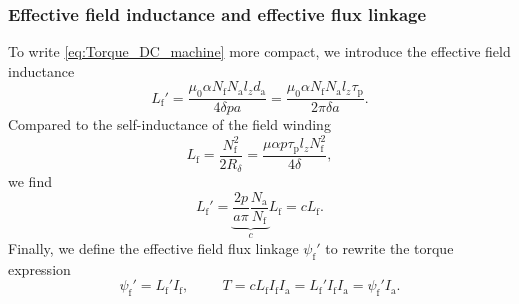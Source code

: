 \begin{frame}
	\frametitle{Effective field inductance and effective flux linkage}
    To write \eqref{eq:Torque_DC_machine} more compact, we introduce the effective field inductance 
	\begin{equation}
		L_\mathrm{f}' =  \frac{\mu_0 \alpha N_\mathrm{f} N_\mathrm{a} l_z d_\mathrm{a}}{4 \delta p a } = \frac{\mu_0 \alpha N_\mathrm{f} N_\mathrm{a} l_z \tau_\mathrm{p}}{2 \pi  \delta a}.
		\label{eq:Effective_field_inductance}
	\end{equation} \pause
	Compared to the self-inductance of the field winding 
	\begin{equation}
		L_\mathrm{f} = \frac{N_\mathrm{f}^2}{2 R_\delta} = \frac{\mu  \alpha p \tau_\mathrm{p} l_z N_\mathrm{f}^2}{4 \delta},
	 \end{equation} \pause
	 we find
	 \begin{equation}
		 L_\mathrm{f}' = \underbrace{\frac{2p}{a \pi}\frac{N_\mathrm{a}}{N_\mathrm{f}}}_{c} L_\mathrm{f}  = c L_\mathrm{f} .
	\end{equation} \pause
	Finally, we define the effective field flux linkage $\psi_\mathrm{f}'$ to rewrite the torque expression
	\begin{equation}
		\psi_\mathrm{f}' = L_\mathrm{f}' I_\mathrm{f}, \hspace{1cm} T = c L_\mathrm{f} I_\mathrm{f} I_\mathrm{a} = L_\mathrm{f}' I_\mathrm{f} I_\mathrm{a}  = \psi_\mathrm{f}' I_\mathrm{a}.
		\label{eq:Effective_field_flux_linkage}
	\end{equation}
\end{frame}

